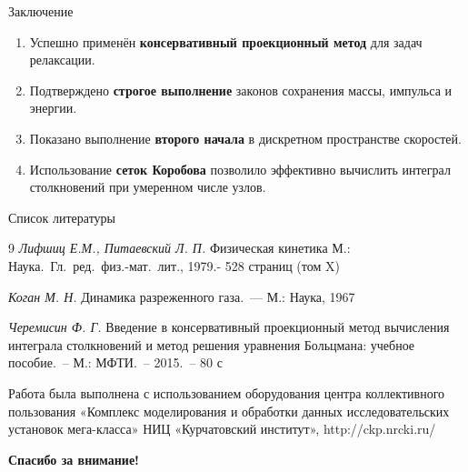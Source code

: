 \documentclass[aspectratio=169]{beamer}
\begin{document}


    \begin{frame}{Заключение}
        \begin{enumerate}
            \item Успешно применён \textbf{консервативный проекционный метод} для задач релаксации.
            \item Подтверждено \textbf{строгое выполнение} законов сохранения массы, импульса и энергии.
            \item Показано выполнение \textbf{второго начала} в дискретном пространстве скоростей.
            \item Использование \textbf{сеток Коробова} позволило эффективно вычислить интеграл столкновений при
            умеренном числе узлов.
        \end{enumerate}
    \end{frame}

    \begin{frame}{Список литературы}
        \begin{thebibliography}{9}
            \textit{Лифшиц Е.М., Питаевский Л. П.} Физическая кинетика М.: Наука.~Гл.~ред.~физ.-мат.~лит., 1979.- 528
            страниц (том X)
            
            \textit{Коган М. Н.} Динамика разреженного газа.~— М.: Наука, 1967
            
            \textit{Черемисин Ф. Г.} Введение в консервативный проекционный метод вычисления интеграла столкновений и
            метод решения уравнения Больцмана: учебное пособие.~– М.: МФТИ.~– 2015.~– 80 с
        \end{thebibliography}
        \vspace{5mm}
        Работа была выполнена с использованием оборудования центра коллективного пользования «Комплекс моделирования и
        обработки данных исследовательских установок мега-класса» НИЦ «Курчатовский институт», http://ckp.nrcki.ru/
    \end{frame}

    \begin{frame}[plain]
    \centering
    \Huge \textbf{Спасибо за внимание!}
    \end{frame}
\end{document}
